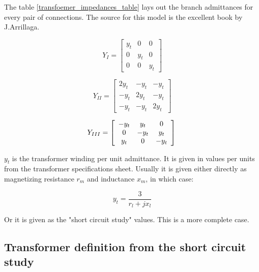 \documentclass[a4paper,twoside,fleqn]{tufte-book}
\begin{document}
The table \ref{transfoemer_impedances_table} lays out the branch admittances for every pair of connections. The source for this model is the excellent book by J.Arrillaga\cite{arrillaga1990computer}.

\begin{equation}
Y_{I} = \left[ \begin{array}{ccc}
y_t & 0 &  0 \\
0 & y_t & 0 \\ 
0 & 0 & y_t
\end{array} \right] 
\end{equation}

\begin{equation}
Y_{II} = \left[ \begin{array}{ccc}
2y_t & -y_t &  -y_t \\
-y_t & 2y_t & -y_t \\  
-y_t & -y_t & 2y_t
\end{array} \right] 
\end{equation}

\begin{equation}
Y_{III} = \left[ \begin{array}{ccc}
-y_t & y_t &  0 \\
0 & -y_t & y_t \\ 
y_t & 0 & -y_t
\end{array} \right] \newline
\end{equation}


$y_t$ is the transformer winding per unit admittance. It is given in values per units from the transformer specifications sheet. Usually it is given either directly as magnetizing resistance $r_m$ and inductance $x_m$, in which case:

\begin{equation}
y_t = \frac{3}{r_l + jx_l}
\end{equation}

Or it is given as the "short circuit study" values. This is a more complete case.



\subsection{Transformer definition from the short circuit study}
\end{document}
